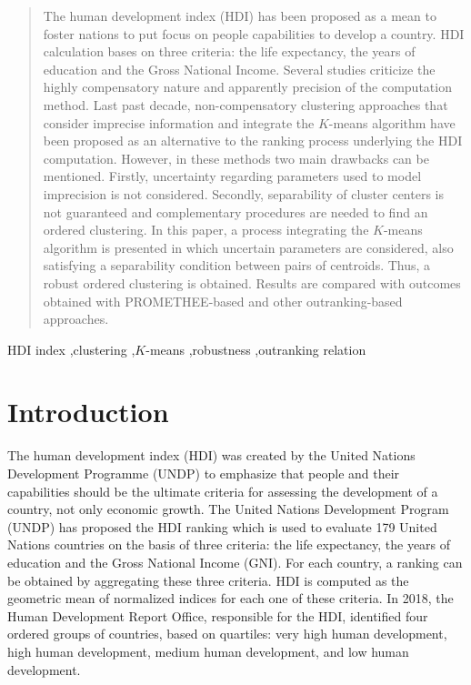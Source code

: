 \documentclass[]{elsarticle}
\theoremstyle{definition}
\begin{document}
\begin{frontmatter}
\begin{abstract}
The human development index (HDI) has been proposed as a mean to foster nations to put focus on people capabilities to develop a country.  HDI calculation bases on three criteria: the life expectancy, the years of education and the Gross National Income. Several studies criticize the highly compensatory nature and apparently precision of the computation method. Last past decade, non-compensatory clustering approaches that consider imprecise information and integrate the $K$-means algorithm  have been proposed as an alternative to the ranking process underlying the HDI computation. However, in these methods two main drawbacks can be mentioned. Firstly, uncertainty regarding parameters used to model imprecision is not considered. Secondly, separability of cluster centers is not guaranteed and complementary procedures are needed to find an ordered clustering. In this paper, a process integrating  the $K$-means algorithm is presented in which uncertain parameters are considered, also satisfying a separability condition between pairs of centroids. Thus,  a robust ordered clustering  is obtained.   Results are compared with outcomes obtained with PROMETHEE-based and other outranking-based approaches.
\end{abstract}

\begin{keyword}
HDI index \sep clustering \sep $K$-means \sep robustness \sep outranking relation 
\end{keyword}

\end{frontmatter}


\section{Introduction}

The human development index (HDI) was created by the United Nations Development Programme (UNDP) to emphasize that people and their capabilities should be the ultimate criteria for assessing the development of a country, not only economic growth. The United Nations Development Program (UNDP) has proposed the HDI ranking which is used to evaluate  179 United Nations countries on the basis of three criteria: the life expectancy, the years of education and the Gross National Income (GNI). For each country, a ranking can be obtained by aggregating these three criteria.  HDI is computed as the geometric mean of normalized indices for each one of these criteria.  In 2018, the Human Development Report Office, responsible for the HDI, identified four ordered groups of countries, based on quartiles: very high human development, high human development, medium human development, and low human development.   
\end{document}

